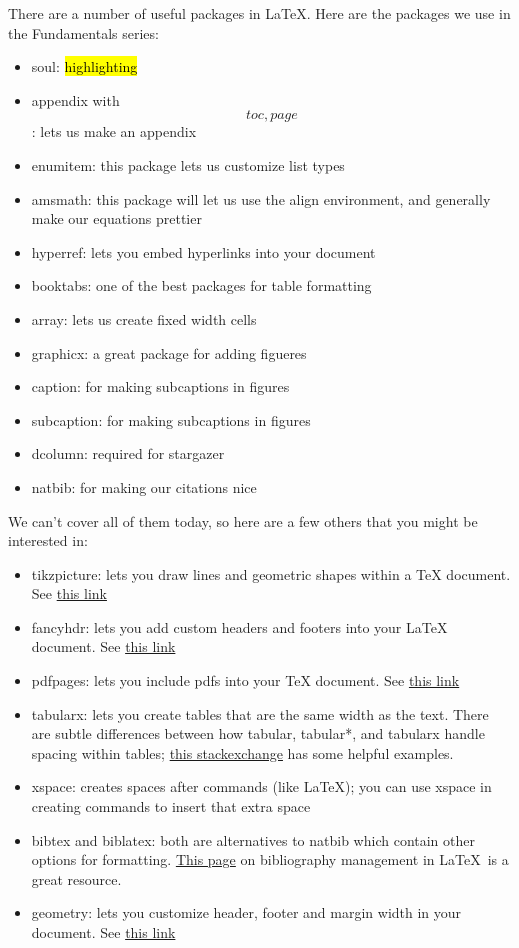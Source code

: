 \documentclass{article}
\begin{document}
There are a number of useful packages in \LaTeX. Here are the packages we use in the Fundamentals series:
\begin{itemize}
	\item soul: \hl{highlighting}
	\item appendix with \[toc, page\]: lets us make an appendix
	\item enumitem: this package lets us customize list types
	\item amsmath: this package will let us use the align environment, and generally make our equations prettier
	\item hyperref: lets you embed hyperlinks into your document
	\item booktabs: one of the best packages for table formatting
	\item array: lets us create fixed width cells
	\item graphicx: a great package for adding figueres 
	\item caption: for making subcaptions in figures
	\item subcaption: for making subcaptions in figures
	\item dcolumn: required for stargazer
	\item natbib: for making our citations nice
\end{itemize}
We can't cover all of them today, so here are a few others that you might be interested in:
\begin{itemize}
	\item tikzpicture: lets you draw lines and geometric shapes within a TeX document. See \href{http://cremeronline.com/LaTeX/minimaltikz.pdf}{this link}
	\item fancyhdr: lets you add custom headers and footers into your LaTeX document. See \href{https://www.ctan.org/pkg/fancyhdr}{this link}
	\item pdfpages: lets you include pdfs into your TeX document. See \href{https://www.ctan.org/pkg/pdfpages}{this link}
	\item tabularx: lets you create tables that are the same width as the text. There are subtle differences between how tabular, tabular*, and tabularx handle spacing within tables; \href{https://tex.stackexchange.com/questions/341205/what-is-the-difference-between-tabular-tabular-and-tabularx-environments/341212}{this stackexchange} has some helpful examples.
	\item xspace: creates spaces after commands (like \LaTeX); you can use xspace in creating commands to insert that extra space
	\item bibtex and biblatex: both are alternatives to natbib which contain other options for formatting. \href{https://www.sharelatex.com/learn/Bibliography_management_in_LaTeX}{This page} on bibliography management in \LaTeX\ is a great resource.
	\item geometry: lets you customize header, footer and margin width in your document. See \href{https://www.ctan.org/pkg/geometry}{this link}
\end{itemize}
\end{document}
